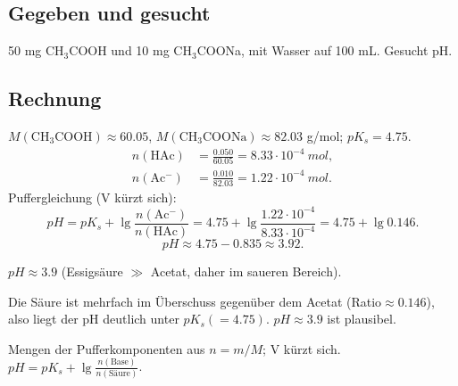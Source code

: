 
\subsection*{Gegeben und gesucht}
50 mg CH$_3$COOH und 10 mg CH$_3$COONa, mit Wasser auf 100 mL. Gesucht pH.

\subsection*{Rechnung}
$M(\mathrm{CH_3COOH})\approx60.05$, $M(\mathrm{CH_3COONa})\approx82.03$
g/mol; $pK_s=4.75$.
\begin{align*}
  n(\mathrm{HAc}) &= \frac{0.050}{60.05} = 8.33\cdot10^{-4}\ mol,\\
  n(\mathrm{Ac^-}) &= \frac{0.010}{82.03} = 1.22\cdot10^{-4}\ mol.
\end{align*}
Puffergleichung (V kürzt sich):
\[
  pH = pK_s + \lg\frac{n(\mathrm{Ac^-})}{n(\mathrm{HAc})}
     = 4.75 + \lg\frac{1.22\cdot10^{-4}}{8.33\cdot10^{-4}}
     = 4.75 + \lg 0.146 .
\]
\[
  pH \approx 4.75 - 0.835 \approx 3.92 .
\]

\begin{ergebnis}
$pH \approx 3.9$ (Essigsäure $\gg$ Acetat, daher im saueren Bereich).
\end{ergebnis}

\begin{kontrolle}
Die Säure ist mehrfach im Überschuss gegenüber dem Acetat
(Ratio$\approx0.146$), also liegt der pH deutlich unter $pK_s(=4.75)$.
$pH\approx3.9$ ist plausibel.
\end{kontrolle}

\begin{merksatz}
Mengen der Pufferkomponenten aus $n=m/M$; V kürzt sich. $pH=pK_s+\lg
\frac{n(\text{Base})}{n(\text{Säure})}$.
\end{merksatz}
